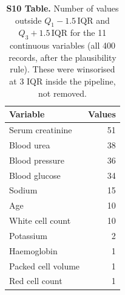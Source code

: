 \begin{table}[!ht]\centering\small
\caption{{\bf S10 Table.} Number of values outside $Q_1-1.5\,\mathrm{IQR}$ and $Q_3+1.5\,\mathrm{IQR}$ for the 11 continuous variables (all 400 records, after the plausibility rule). These were winsorised at 3 IQR inside the pipeline, not removed.}
\begin{tabular}{lr}\toprule
Variable & Values\\\midrule
Serum creatinine & 51\\
Blood urea & 38\\
Blood pressure & 36\\
Blood glucose & 34\\
Sodium & 15\\
Age & 10\\
White cell count & 10\\
Potassium & 2\\
Haemoglobin & 1\\
Packed cell volume & 1\\
Red cell count & 1\\
\bottomrule\end{tabular}\end{table}
